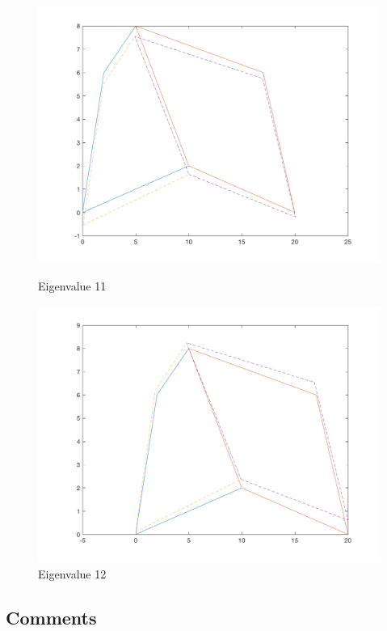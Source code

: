 \documentclass[11pt]{amsart}
\begin{document}
\begin{figure}[H]
\begin{minipage}[b]{0.5\linewidth}
    \centering
    \includegraphics[width=.5\linewidth]{eigenvectors/eigenvector_11_fullint.png} 
    \caption{Eigenvalue 11} 
    \vspace{4ex}
  \end{minipage}%
  \begin{minipage}[b]{0.5\linewidth}
    \centering
    \includegraphics[width=.5\linewidth]{eigenvectors/eigenvector_12_fullint.png} 
    \caption{Eigenvalue 12} 
    \vspace{4ex}
  \end{minipage} 
\end{figure}

\subsection{Comments}
\end{document}
